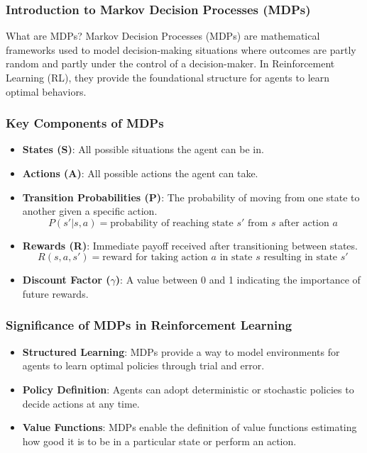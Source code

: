\documentclass[aspectratio=169]{beamer}
\begin{document}
\frame{\titlepage}

\begin{frame}[fragile]
    \frametitle{Introduction to Markov Decision Processes (MDPs)}
    \begin{block}{What are MDPs?}
        Markov Decision Processes (MDPs) are mathematical frameworks used to model decision-making situations where outcomes are partly random and partly under the control of a decision-maker. In Reinforcement Learning (RL), they provide the foundational structure for agents to learn optimal behaviors.
    \end{block}
\end{frame}

\begin{frame}[fragile]
    \frametitle{Key Components of MDPs}
    \begin{itemize}
        \item \textbf{States (S)}: All possible situations the agent can be in. 
        \item \textbf{Actions (A)}: All possible actions the agent can take.
        \item \textbf{Transition Probabilities (P)}: The probability of moving from one state to another given a specific action. 
        $$ P(s'|s, a) = \text{probability of reaching state } s' \text{ from } s \text{ after action } a $$
        \item \textbf{Rewards (R)}: Immediate payoff received after transitioning between states. 
        $$ R(s, a, s') = \text{reward for taking action } a \text{ in state } s \text{ resulting in state } s' $$
        \item \textbf{Discount Factor ($\gamma$)}: A value between 0 and 1 indicating the importance of future rewards.
    \end{itemize}
\end{frame}

\begin{frame}[fragile]
    \frametitle{Significance of MDPs in Reinforcement Learning}
    \begin{itemize}
        \item \textbf{Structured Learning}: MDPs provide a way to model environments for agents to learn optimal policies through trial and error.
        \item \textbf{Policy Definition}: Agents can adopt deterministic or stochastic policies to decide actions at any time.
        \item \textbf{Value Functions}: MDPs enable the definition of value functions estimating how good it is to be in a particular state or perform an action.
    \end{itemize}
\end{frame}
\end{document}
